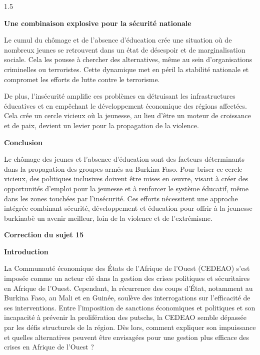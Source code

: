 \documentclass[12pt]{article}
\begin{document}
\begin{spacing}{1.5}
\quad

\textbf{Une combinaison explosive pour la sécurité nationale}

Le cumul du chômage et de l'absence d'éducation crée une situation où de nombreux jeunes se retrouvent dans un état de désespoir et de marginalisation sociale. Cela les pousse à chercher des alternatives, même au sein d’organisations criminelles ou terroristes. Cette dynamique met en péril la stabilité nationale et compromet les efforts de lutte contre le terrorisme.

De plus, l’insécurité amplifie ces problèmes en détruisant les infrastructures éducatives et en empêchant le développement économique des régions affectées. Cela crée un cercle vicieux où la jeunesse, au lieu d’être un moteur de croissance et de paix, devient un levier pour la propagation de la violence.

\quad

\textbf{Conclusion}

Le chômage des jeunes et l'absence d'éducation sont des facteurs déterminants dans la propagation des groupes armés au Burkina Faso. Pour briser ce cercle vicieux, des politiques inclusives doivent être mises en œuvre, visant à créer des opportunités d’emploi pour la jeunesse et à renforcer le système éducatif, même dans les zones touchées par l’insécurité. Ces efforts nécessitent une approche intégrée combinant sécurité, développement et éducation pour offrir à la jeunesse burkinabè un avenir meilleur, loin de la violence et de l'extrémisme.


\quad

\textbf{Correction du sujet 15}


\quad

\textbf{Introduction}

La Communauté économique des États de l’Afrique de l’Ouest (CEDEAO) s’est imposée comme un acteur clé dans la gestion des crises politiques et sécuritaires en Afrique de l’Ouest. Cependant, la récurrence des coups d’État, notamment au Burkina Faso, au Mali et en Guinée, soulève des interrogations sur l’efficacité de ses interventions. Entre l’imposition de sanctions économiques et politiques et son incapacité à prévenir la prolifération des putschs, la CEDEAO semble dépassée par les défis structurels de la région. Dès lors, comment expliquer son impuissance et quelles alternatives peuvent être envisagées pour une gestion plus efficace des crises en Afrique de l’Ouest ?

\quad


\end{spacing}
\end{document}
